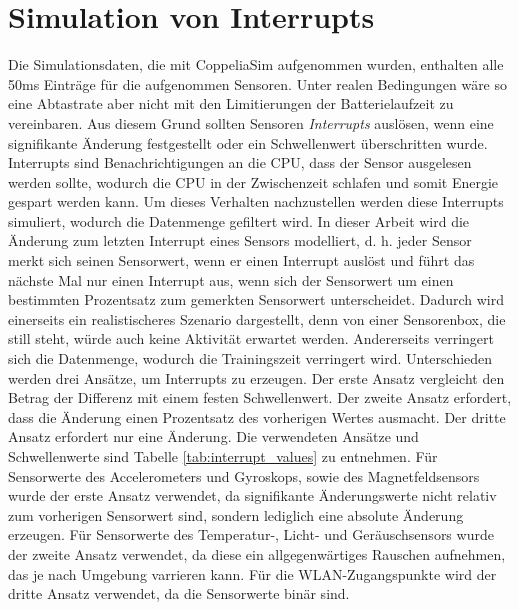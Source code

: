 \section{Simulation von Interrupts}
Die Simulationsdaten, die mit CoppeliaSim aufgenommen wurden, enthalten alle 50ms Einträge für die aufgenommen Sensoren.
Unter realen Bedingungen wäre so eine Abtastrate aber nicht mit den Limitierungen der Batterielaufzeit zu vereinbaren.
Aus diesem Grund sollten Sensoren \textit{Interrupts} auslösen, wenn eine signifikante Änderung festgestellt oder ein Schwellenwert überschritten wurde.
Interrupts sind Benachrichtigungen an die CPU, dass der Sensor ausgelesen werden sollte, wodurch die CPU in der Zwischenzeit schlafen und somit Energie gespart werden kann.
\newline
\newline
Um dieses Verhalten nachzustellen werden diese Interrupts simuliert, wodurch die Datenmenge gefiltert wird.
In dieser Arbeit wird die Änderung zum letzten Interrupt eines Sensors modelliert,
d. h. jeder Sensor merkt sich seinen Sensorwert, wenn er einen Interrupt auslöst
und führt das nächste Mal nur einen Interrupt aus, wenn sich der Sensorwert um einen bestimmten Prozentsatz zum gemerkten Sensorwert unterscheidet.
\newline
\newline
Dadurch wird einerseits ein realistischeres Szenario dargestellt,
denn von einer Sensorenbox, die still steht, würde auch keine Aktivität erwartet werden.
Andererseits verringert sich die Datenmenge, wodurch die Trainingszeit verringert wird.
\newpage
Unterschieden werden drei Ansätze, um Interrupts zu erzeugen.
Der erste Ansatz vergleicht den Betrag der Differenz mit einem festen Schwellenwert.
Der zweite Ansatz erfordert, dass die Änderung einen Prozentsatz des vorherigen Wertes ausmacht.
Der dritte Ansatz erfordert nur eine Änderung.
\newline
\newline
Die verwendeten Ansätze und Schwellenwerte sind Tabelle \ref{tab:interrupt_values} zu entnehmen.
Für Sensorwerte des Accelerometers und Gyroskops, sowie des Magnetfeldsensors wurde der erste Ansatz verwendet,
da signifikante Änderungswerte nicht relativ zum vorherigen Sensorwert sind, sondern lediglich eine absolute Änderung erzeugen.
Für Sensorwerte des Temperatur-, Licht- und Geräuschsensors wurde der zweite Ansatz verwendet,
da diese ein allgegenwärtiges Rauschen aufnehmen, das je nach Umgebung varrieren kann.
Für die WLAN-Zugangspunkte wird der dritte Ansatz verwendet, da die Sensorwerte binär sind.

